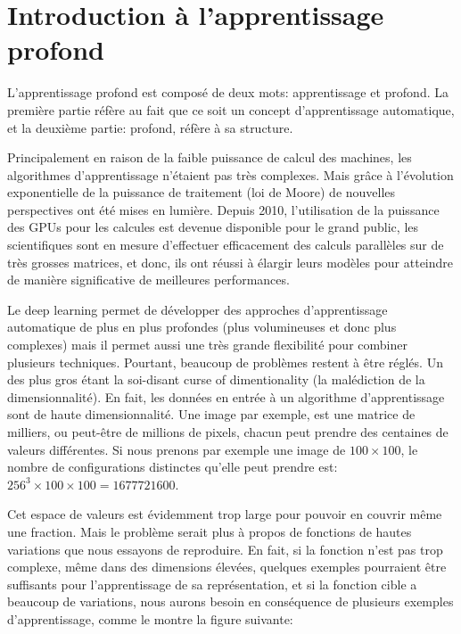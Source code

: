 \section{Introduction à l'apprentissage profond}

L'apprentissage profond est composé de deux mots: apprentissage et profond. La première partie réfère au fait que ce soit un concept d'apprentissage automatique, et la deuxième partie: profond, réfère à sa structure.

Principalement en raison de la faible puissance de calcul des machines, les algorithmes d'apprentissage n'étaient pas très complexes. Mais grâce à l'évolution exponentielle de la puissance de traitement (loi de Moore) de nouvelles perspectives ont été mises en lumière.
Depuis 2010, l'utilisation de la puissance des GPUs pour les calcules est devenue disponible pour le grand public, les scientifiques sont en mesure d'effectuer efficacement des calculs parallèles sur de très grosses matrices, et donc, ils ont réussi à élargir leurs modèles pour atteindre de manière significative de meilleures performances.


Le deep learning permet de développer des approches d'apprentissage automatique de plus en plus profondes (plus volumineuses et donc plus complexes) mais il permet aussi une très grande flexibilité pour combiner plusieurs techniques. Pourtant, beaucoup de problèmes restent à être réglés. Un des plus gros étant la soi-disant curse of dimentionality (la malédiction de la dimensionnalité). En fait, les données en entrée à un algorithme d'apprentissage sont de haute dimensionnalité. Une image par exemple, est une matrice de milliers, ou peut-être de millions de pixels, chacun peut prendre des centaines de valeurs différentes. Si nous prenons par exemple une image de $100 \times 100$, le nombre de configurations distinctes qu'elle peut prendre est:
$256^{3} \times 100 \times 100 = 1 677 721 600$.

Cet espace de valeurs est évidemment trop large pour pouvoir en couvrir même une fraction. Mais le problème serait plus à propos de fonctions de hautes variations que nous essayons de reproduire. En fait, si la fonction n'est pas trop complexe, même dans des dimensions élevées, quelques exemples pourraient être suffisants pour l'apprentissage de sa représentation, et si la fonction cible a beaucoup de variations, nous aurons besoin en conséquence de plusieurs exemples d'apprentissage, comme le montre la figure suivante:

